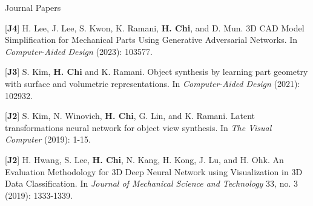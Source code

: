 


\begin{cventries}
\cvpub
{Journal Papers} %
{ %
\begin{cvitems}
    \item {[\textbf{J4}] H. Lee, J. Lee, S. Kwon, K. Ramani, \textbf{H. Chi}, and D. Mun. 3D CAD Model Simplification for Mechanical Parts Using Generative Adversarial Networks. In \textit{Computer-Aided Design} (2023): 103577.}
    \item {[\textbf{J3}] S. Kim, \textbf{H. Chi} and K. Ramani. Object synthesis by learning part geometry with surface and volumetric representations. In \textit{Computer-Aided Design} (2021): 102932.}
    \item {[\textbf{J2}] S. Kim, N. Winovich, \textbf{H. Chi}, G. Lin, and K. Ramani. Latent transformations neural network for object view synthesis. In \textit{The Visual Computer} (2019): 1-15.}
    \item {[\textbf{J2}] H. Hwang, S. Lee, \textbf{H. Chi}, N. Kang, H. Kong, J. Lu, and H. Ohk. An Evaluation Methodology for 3D Deep Neural Network using Visualization in 3D Data Classification. In \textit{Journal of Mechanical Science and Technology} 33, no. 3 (2019): 1333-1339.}
\end{cvitems}
}


\end{cventries}
